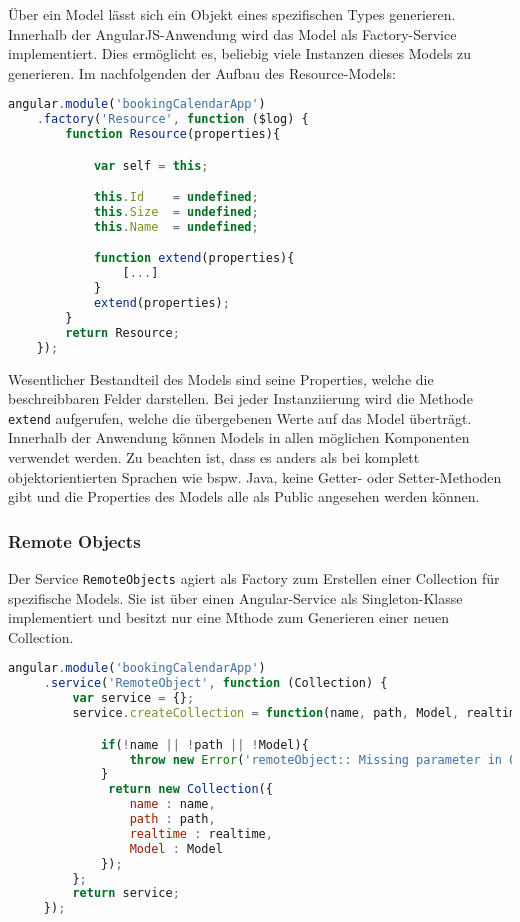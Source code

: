 Über ein Model lässt sich ein Objekt eines spezifischen Types generieren.
Innerhalb der AngularJS-Anwendung wird das Model als Factory-Service implementiert. Dies ermöglicht es, beliebig viele Instanzen dieses Models zu generieren.
Im nachfolgenden der Aufbau des Resource-Models:

\begin{lstlisting}[language=Javascript, label=code_ResourceModel, caption=Hauptteil des Resource-Models]
angular.module('bookingCalendarApp')
    .factory('Resource', function ($log) {
        function Resource(properties){

            var self = this;

            this.Id    = undefined;
            this.Size  = undefined;
            this.Name  = undefined;

            function extend(properties){
                [...]
            }
            extend(properties);
        }
        return Resource;
    });
\end{lstlisting}

Wesentlicher Bestandteil des Models sind seine Properties, welche die beschreibbaren Felder darstellen. Bei jeder Instanziierung wird die Methode \texttt{extend\(\)} aufgerufen, welche die
übergebenen Werte auf das Model überträgt.
Innerhalb der Anwendung können Models in allen möglichen Komponenten verwendet werden. Zu beachten ist, dass es anders als bei komplett objektorientierten Sprachen wie bspw. Java,
keine Getter- oder Setter-Methoden gibt und die Properties des Models alle als Public angesehen werden können.


\subsubsection{Remote Objects}
Der Service \texttt{RemoteObjects} agiert als Factory zum Erstellen einer Collection für spezifische Models. Sie ist über einen Angular-Service als Singleton-Klasse implementiert und besitzt
 nur eine Mthode zum Generieren einer neuen Collection.

 \begin{lstlisting}[language=Javascript, label=code_RemoteObject, caption=Code des RemoteObjects-Service]
 angular.module('bookingCalendarApp')
     .service('RemoteObject', function (Collection) {
         var service = {};
         service.createCollection = function(name, path, Model, realtime){

             if(!name || !path || !Model){
                 throw new Error('remoteObject:: Missing parameter in Object')
             }
              return new Collection({
                 name : name,
                 path : path,
                 realtime : realtime,
                 Model : Model
             });
         };
         return service;
     });
\end{lstlisting}

